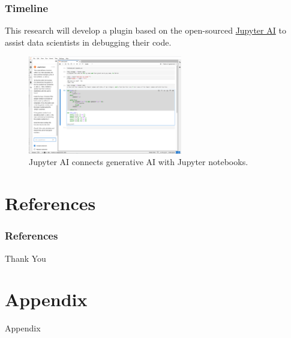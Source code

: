 \documentclass{beamer}
\begin{document}
\begin{frame}[allowframebreaks]
  \frametitle{Timeline}
  This research will develop a plugin based on the open-sourced \href{https://github.com/jupyterlab/jupyter-ai?tab=readme-ov-file}{Jupyter AI} to assist data scientists in debugging their code.
  \begin{figure}
    \centering
    \includegraphics[width=0.6\textwidth]{img/jupyter_ai_screenshot.png}
    \caption{Jupyter AI connects generative AI with Jupyter notebooks.}\label{fig:jupyter_ai_screenshot}
  \end{figure}
  \end{frame}

\section{References}
\begin{frame}[allowframebreaks]
\frametitle{References}\scriptsize


\end{frame}

\begin{frame}
\Huge{\centerline{Thank You}}
\end{frame}

\section{Appendix}
\begin{frame}{Appendix}
\end{frame}
\end{document}
